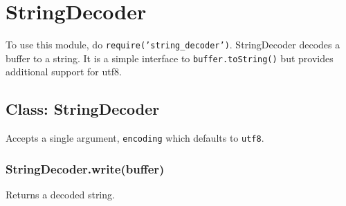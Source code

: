 \section{StringDecoder}

\begin{Shaded}
\begin{Highlighting}[]
\NormalTok{: } 
\end{Highlighting}
\end{Shaded}

To use this module, do \texttt{require('string\_decoder')}.
StringDecoder decodes a buffer to a string. It is a simple interface to
\texttt{buffer.toString()} but provides additional support for utf8.

\begin{Shaded}
\begin{Highlighting}[]
 \NormalTok{;}
  \NormalTok{);}

  \NormalTok{Buffer([}\NormalTok{, }\NormalTok{]);}
\NormalTok{(}

  \NormalTok{Buffer([}\NormalTok{, }\NormalTok{, }\NormalTok{]);}
\NormalTok{(}
\end{Highlighting}
\end{Shaded}

\subsection{Class: StringDecoder}

Accepts a single argument, \texttt{encoding} which defaults to
\texttt{utf8}.

\subsubsection{StringDecoder.write(buffer)}

Returns a decoded string.
